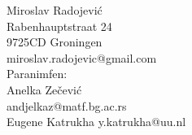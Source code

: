 \documentclass[10pt]{report}
\begin{document}
\begin{center}
	\bigskip
	\bigskip

  	{\Large Miroslav Radojevi\'{c}}\\[0.5em]
  	Rabenhauptstraat 24\\
  	9725CD Groningen\\
  	miroslav.radojevic@gmail.com\\[1em]
  	{\normalsize Paranimfen:}\\[0.5em]
  	An\dj elka Ze\v{c}evi\'{c}\\
  	andjelkaz@matf.bg.ac.rs\\[0.5em]
  	Eugene Katrukha
  	y.katrukha@uu.nl
  
\end{center}

\end{document}
